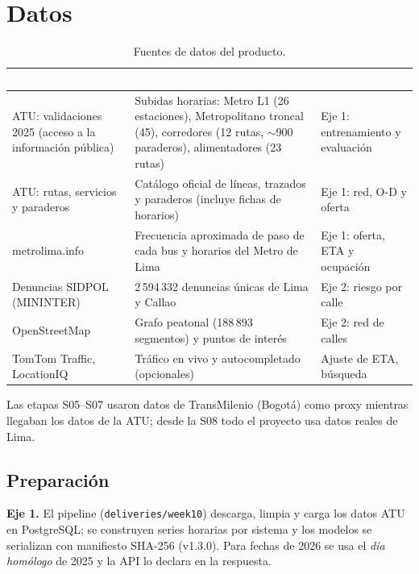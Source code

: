 \documentclass[11pt]{article}
\newcommand{\code}[1]{\texttt{#1}}
\begin{document}
\section{Datos}

\begin{table}[H]
\centering\small
\begin{tabularx}{\textwidth}{@{}p{3.6cm}Xp{3.3cm}@{}}
\toprule
\rowcolor{tablehead} \textcolor{white}{\bfseries Fuente} & \textcolor{white}{\bfseries Contenido} & \textcolor{white}{\bfseries Uso} \\
\midrule
ATU: validaciones 2025 (acceso a la información pública) & Subidas horarias: Metro L1 (26 estaciones), Metropolitano troncal (45), corredores (12 rutas, $\sim$900 paraderos), alimentadores (23 rutas) & Eje 1: entrenamiento y evaluación \\
\rowcolor{tablerow} ATU: rutas, servicios y paraderos & Catálogo oficial de líneas, trazados y paraderos (incluye fichas de horarios) & Eje 1: red, O-D y oferta \\
metrolima.info & Frecuencia aproximada de paso de cada bus y horarios del Metro de Lima & Eje 1: oferta, ETA y ocupación \\
Denuncias SIDPOL (MININTER) & 2\,594\,332 denuncias únicas de Lima y Callao & Eje 2: riesgo por calle \\
\rowcolor{tablerow} OpenStreetMap & Grafo peatonal (188\,893 segmentos) y puntos de interés & Eje 2: red de calles \\
TomTom Traffic, LocationIQ & Tráfico en vivo y autocompletado (opcionales) & Ajuste de ETA, búsqueda \\
\bottomrule
\end{tabularx}
\caption{Fuentes de datos del producto.}
\end{table}

Las etapas S05--S07 usaron datos de TransMilenio (Bogotá) como proxy mientras llegaban los datos de
la ATU; desde la S08 todo el proyecto usa datos reales de Lima.

\subsection{Preparación}

\textbf{Eje 1.} El pipeline (\code{deliveries/week10}) descarga, limpia y carga los datos ATU en
PostgreSQL; se construyen series horarias por sistema y los modelos se serializan con manifiesto
SHA-256 (v1.3.0). Para fechas de 2026 se usa el \emph{día homólogo} de 2025 y la API lo declara en
la respuesta.
\end{document}

